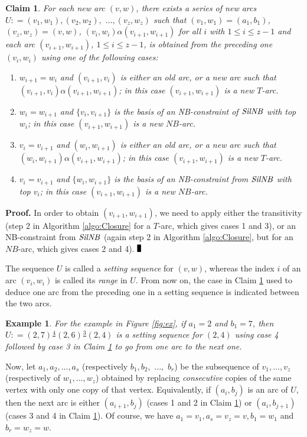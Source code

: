\documentclass{article}
\newcommand{\Sil}{{\it SilNB}}
\newtheorem{fait}{Claim}
\newtheorem{ex}{Example}
\newcommand{\bex}{\begin{ex}\rm}
\newcommand{\eex}{\end{ex}}
\newcommand{\bfn}{\begin{fait}}
\newcommand{\efn}{\end{fait}}
\renewcommand{\Box}{\rule{1.5mm}{3mm}}
\begin{document}
\bfn
For each new arc $(v,w)$, there exists a series of new arcs $U: =(v_1,w_1), (v_2,w_2),$ $ \ldots, (v_z,w_z)$ such that  $(v_1,w_1)=(a_1,b_1)$,  $(v_z,w_z)=(v,w)$, $(v_i,w_i)\alpha(v_{i+1},w_{i+1})$ for all $i$ with $1\leq i\leq z-1$ 
and each arc $(v_{i+1}, w_{i+1})$, $1\leq i\leq z-1$, is obtained from the preceding one $(v_i,w_i)$ using one of the following cases:

\begin{enumerate}
\item $w_{i+1}=w_i$ and $(v_{i+1},v_i)$ is either an old arc, or a new arc such that $(v_{i+1},v_i)\alpha (v_{i+1}, w_{i+1})$; in this case $(v_{i+1},w_{i+1})$ is a new $T$-arc.
\item  $w_{i}=w_{i+1}$ and $\{v_i,v_{i+1}\}$ is the basis of an NB-constraint of $\Sil$ 
with top $w_i$; in this case $(v_{i+1},w_{i+1})$ is a new $NB$-arc.
\item $v_i=v_{i+1}$ and $(w_i,w_{i+1})$ is either an old arc,  or a new arc such that
$(w_{i},w_{i+1})\alpha (v_{i+1}, w_{i+1})$; in  this case $(v_{i+1},w_{i+1})$ is a new $T$-arc.
\item  $v_i=v_{i+1}$ 
and $\{w_i,w_{i+1}\}$ is the basis of an NB-constraint from $\Sil$ with top $v_i$;
in this case $(v_{i+1},w_{i+1})$ is a new $NB$-arc.
\end{enumerate}
\label{claim:imminduce}

\efn  



{\bf Proof.} In order to obtain  $(v_{i+1},w_{i+1})$, we need to apply either the transitivity
(step 2 in Algorithm \ref{algo:Closure} for a $T$-arc,  which gives cases 1 and 3), or an NB-constraint from $\Sil$
(again step 2 in Algorithm \ref{algo:Closure}, but for an $NB$-arc, which gives cases 2 and 4). 
$\Box$  
\bigskip



The sequence $U$ is called a {\em setting sequence} for $(v,w)$, whereas the index $i$
of an arc $(v_i,w_i)$ is called its {\em range} in $U$. From now on, the
case in Claim \ref{claim:imminduce} used to deduce one arc from the preceding one in a setting sequence 
is  indicated between the two arcs.

\bex
For the example in Figure \ref{fig:ex}, if $a_1=2$ and $b_1=7$, then $U: =(2,7) \frac{4}{} (2,6)\frac{3}{}(2,4)$
is a setting sequence for $(2,4)$ using case 4 followed by case 3 in Claim \ref{claim:imminduce} to go
from one arc to the next one. 
\label{ex:U}
\eex

Now, let $a_1, a_2, \ldots, a_s$ (respectively  
$b_1, b_2, $ $\ldots,$ $b_r$) be the subsequence of $v_1, \ldots, v_z$ 
(respectively of $w_1, \ldots, w_z$) obtained by replacing  {\em consecutive} 
copies of the same vertex with only one copy of that vertex. Equivalently, if $(a_i,b_j)$ is 
an arc of $U$, then the next arc is either  $(a_{i+1}, b_j)$ (cases 1 and 2 in 
Claim \ref{claim:imminduce}) or $(a_i,b_{j+1})$ (cases 3 and 4 in Claim
\ref{claim:imminduce}). Of course, we have $a_1=v_1, a_s=v_z=v, b_1=w_1$ and $b_r=w_z=w$.
 
\end{document}
